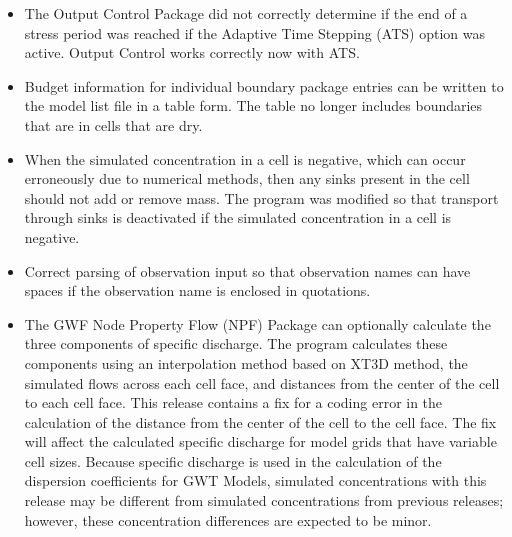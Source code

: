 \documentclass[11pt,twoside,twocolumn]{usgsreport}
\begin{document}
\begin{itemize}
\begin{itemize}
	        \item The Output Control Package did not correctly determine if the end of a stress period was reached if the Adaptive Time Stepping (ATS) option was active.  Output Control works correctly now with ATS.
	        \item Budget information for individual boundary package entries can be written to the model list file in a table form.  The table no longer includes boundaries that are in cells that are dry.
	        \item When the simulated concentration in a cell is negative, which can occur erroneously due to numerical methods, then any sinks present in the cell should not add or remove mass.  The program was modified so that transport through sinks is deactivated if the simulated concentration in a cell is negative.
	        \item Correct parsing of observation input so that observation names can have spaces if the observation name is enclosed in quotations.
	        \item The GWF Node Property Flow (NPF) Package can optionally calculate the three components of specific discharge.  The program calculates these components using an interpolation method based on XT3D method, the simulated flows across each cell face, and distances from the center of the cell to each cell face.  This release contains a fix for a coding error in the calculation of the distance from the center of the cell to the cell face.  The fix will affect the calculated specific discharge for model grids that have variable cell sizes.  Because specific discharge is used in the calculation of the dispersion coefficients for GWT Models, simulated concentrations with this release may be different from simulated concentrations from previous releases; however, these concentration differences are expected to be minor.
	\end{itemize}


\end{itemize}
\end{document}
